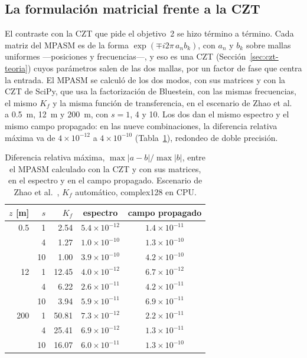 \subsection{La formulación matricial frente a la CZT}
\label{sec:res-czt}

El contraste con la CZT que pide el objetivo~2 se hizo término a término.
Cada matriz del MPASM es de la forma $\exp(\mp i2\pi\,a_n b_k)$, con $a_n$ y
$b_k$ sobre mallas uniformes ---posiciones y frecuencias---, y eso es una CZT
(Sección~\ref{sec:czt-teoria}) cuyos parámetros salen de las dos mallas, por
un factor de fase que centra la entrada. El MPASM se calculó de los dos modos,
con sus matrices y con la CZT de SciPy, que usa la factorización de Bluestein,
con las mismas frecuencias, el mismo $K_f$ y la misma función de
transferencia, en el escenario de Zhao et al.~\cite{zhao2020} a
\SI{0.5}{m}, \SI{12}{m} y \SI{200}{m}, con $s = 1$, 4 y 10. Los dos dan el
mismo espectro y el mismo campo propagado: en las nueve combinaciones, la
diferencia relativa máxima va de $4\times10^{-12}$ a $4\times10^{-10}$
(Tabla~\ref{tab:czt}), redondeo de doble precisión.

\begin{table}[htbp]
  \centering
  \small
  \caption[El MPASM calculado con sus matrices y con la CZT]{Diferencia
  relativa máxima, $\max|a - b|/\max|b|$, entre el MPASM calculado con la CZT
  y con sus matrices, en el espectro y en el campo propagado. Escenario de Zhao
  et al.~\cite{zhao2020}, $K_f$ automático, complex128 en CPU.}
  \label{tab:czt}
  \begin{tabular}{rrrcc}
    \toprule
    $z$ [m] & $s$ & $K_f$ & espectro & campo propagado \\
    \midrule
    0.5   & 1  & 2.54  & $5.4\times10^{-12}$ & $1.4\times10^{-11}$ \\
          & 4  & 1.27  & $1.0\times10^{-10}$ & $1.3\times10^{-10}$ \\
          & 10 & 1.00  & $3.9\times10^{-10}$ & $4.2\times10^{-10}$ \\
    12    & 1  & 12.45 & $4.0\times10^{-12}$ & $6.7\times10^{-12}$ \\
          & 4  & 6.22  & $2.6\times10^{-11}$ & $4.2\times10^{-11}$ \\
          & 10 & 3.94  & $5.9\times10^{-11}$ & $6.9\times10^{-11}$ \\
    200   & 1  & 50.81 & $7.3\times10^{-12}$ & $2.2\times10^{-11}$ \\
          & 4  & 25.41 & $6.9\times10^{-12}$ & $1.3\times10^{-11}$ \\
          & 10 & 16.07 & $6.0\times10^{-11}$ & $1.3\times10^{-10}$ \\
    \bottomrule
  \end{tabular}
\end{table}

